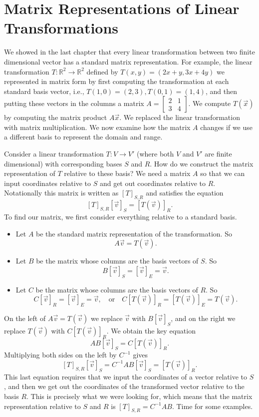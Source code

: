  
\section{Matrix Representations of Linear Transformations}
We showed in the last chapter that every linear transformation between two finite dimensional vector has a standard matrix representation.  
For example, the linear transformation $T\colon {\mathbb{R}}^2 \to {\mathbb{R}}^2$ defined by $T(x,y)=(2x+y,3x+4y)$ we represented in matrix form by first computing the transformation at each standard basis vector, i.e., $T(1,0)=(2,3), T(0,1)=(1,4)$, and then putting these vectors in the columns a matrix 
$A= \begin{bmatrix}2&1\\3&4\end{bmatrix}$. 
We compute $T(\vec x)$ by computing the matrix product $A\vec x$.  We replaced the linear transformation with matrix multiplication. We now examine how the matrix $A$ changes if we use a different basis to represent the domain and range.

Consider a linear transformation $T\colon V \to V'$ (where both $V$ and $V'$ are finite dimensional) with corresponding bases $S$ and $R$. 
How do we construct the matrix representation of $T$ relative to these basis?  
We need a matrix $A$ so that we can input coordinates relative to $S$ and get out coordinates relative to $R$.  
Notationally this matrix is written as $[T]_{S,R}$ and satisfies the equation $$[T]_{S,R}[\vec v]_S=[T(\vec v)]_{R}.$$ 
To find our matrix, we first consider everything relative to a standard basis. 
\begin{itemize}
	\item Let $A$ be the standard matrix representation of the transformation. So $$A\vec v = T(\vec v).$$
	\item Let $B$ be the matrix whose columns are the basis vectors of $S$. So $$B[\vec v]_S=[\vec v]_E=\vec v.$$
	\item Let $C$ be the matrix whose columns are the basis vectors of $R$. So $$C[\vec v]_{R}=[\vec v]_E=\vec v, \quad \text{or}\quad C[T(\vec v)]_{R}=[T(\vec v)]_E=T(\vec v).$$
\end{itemize}
On the left of $A\vec v = T(\vec v)$ we replace $\vec v$ with $B[\vec v]_S$, and on the right we replace $T(\vec v)$ with $C[T(\vec v)]_{R}$. We obtain the key equation 
$$AB[\vec v]_S=C[T(\vec v)]_{R}.$$
Multiplying both sides on the left by $C^{-1}$ gives $$[T]_{S,R}[\vec v]_S=C^{-1}AB[\vec v]_S=[T(\vec v)]_{R}.$$ This last equation requires that we input the coordinates of a vector relative to $S$, and then we get out the coordinates of the transformed vector relative to the basis $R$. This is precisely what we were looking for, which means that the matrix representation relative to $S$ and $R$ is $[T]_{S,R} = C^{-1}AB$. Time for some examples.





